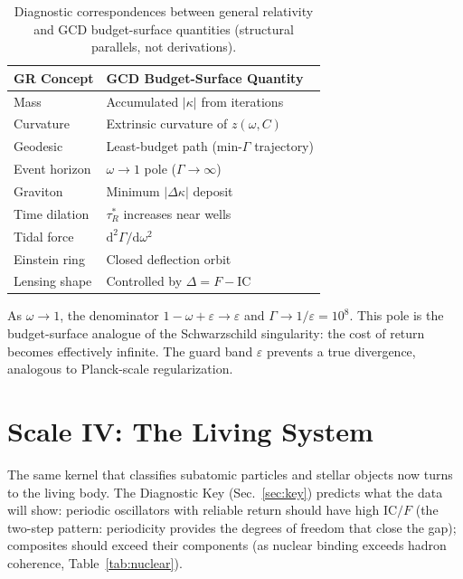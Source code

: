 \documentclass[
  aps,
  prd,
  twocolumn,
  superscriptaddress,
  nofootinbib,
  floatfix
]{revtex4-2}
\newcommand{\tR}{\tau_{\!R}^{*}}
\newcommand{\Gam}{\Gamma}
\newcommand{\eps}{\varepsilon}
\newcommand{\dd}{\mathrm{d}}
\newcommand{\IC}{\mathrm{IC}}
\begin{document}
\begin{table}[t]
\caption{\label{tab:translation}Diagnostic correspondences
between general relativity and GCD budget-surface quantities
(structural parallels, not derivations).}
\begin{ruledtabular}
\begin{tabular}{ll}
GR Concept & GCD Budget-Surface Quantity \\
\hline
Mass & Accumulated $|\kappa|$ from iterations \\
Curvature & Extrinsic curvature of $z(\omega, C)$ \\
Geodesic & Least-budget path (min-$\Gam$ trajectory) \\
Event horizon & $\omega \to 1$ pole ($\Gam \to \infty$) \\
Graviton & Minimum $|\Delta\kappa|$ deposit \\
Time dilation & $\tR$ increases near wells \\
Tidal force & $\dd^2\Gam/\dd\omega^2$ \\
Einstein ring & Closed deflection orbit \\
Lensing shape & Controlled by $\Delta = F - \IC$ \\
\end{tabular}
\end{ruledtabular}
\end{table}

As $\omega \to 1$, the denominator $1 - \omega + \eps \to \eps$
and $\Gam \to 1/\eps = 10^8$.  This pole is the budget-surface
analogue of the Schwarzschild singularity: the cost of return
becomes effectively infinite.  The guard band $\eps$ prevents
a true divergence, analogous to Planck-scale regularization.


\section{Scale IV: The Living System}\label{sec:biology}

The same kernel that classifies subatomic particles and
stellar objects now turns to the living body.  The Diagnostic
Key (Sec.~\ref{sec:key}) predicts what the data will show:
periodic oscillators with reliable return should have high
$\IC/F$ (the two-step pattern: periodicity provides the
degrees of freedom that close the gap); composites should
exceed their components (as nuclear binding exceeds hadron
coherence, Table~\ref{tab:nuclear}).
\end{document}
